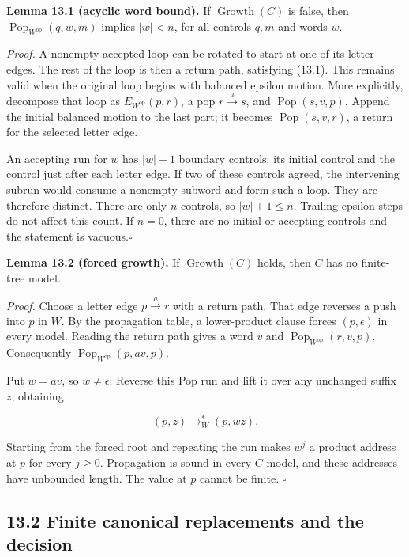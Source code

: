 \documentclass[
  11pt,
  a4paper,
]{article}
\newcounter{none} %
\begin{document}

\textbf{Lemma 13.1 (acyclic word bound).} If
\(\operatorname{Growth}(C)\) is false, then
\(\operatorname{Pop}_{W^{\mathrm{op}}}(q,w,m)\) implies \(|w|<n\), for
all controls \(q,m\) and words \(w\).

\emph{Proof.} A nonempty accepted loop can be rotated to start at one of
its letter edges. The rest of the loop is then a return path, satisfying
(13.1). This remains valid when the original loop begins with balanced
epsilon motion. More explicitly, decompose that loop as
\(E_{W^{\mathrm{op}}}(p,r)\), a pop \(r\xrightarrow{a}s\), and
\(\operatorname{Pop}(s,v,p)\). Append the initial balanced motion to the
last part; it becomes \(\operatorname{Pop}(s,v,r)\), a return for the
selected letter edge.

An accepting run for \(w\) has \(|w|+1\) boundary controls: its initial
control and the control just after each letter edge. If two of these
controls agreed, the intervening subrun would consume a nonempty subword
and form such a loop. They are therefore distinct. There are only \(n\)
controls, so \(|w|+1\le n\). Trailing epsilon steps do not affect this
count. If \(n=0\), there are no initial or accepting controls and the
statement is vacuous.\nobreak\hspace{.5em}\(\square\)


\textbf{Lemma 13.2 (forced growth).} If \(\operatorname{Growth}(C)\)
holds, then \(C\) has no finite-tree model.

\emph{Proof.} Choose a letter edge \(p\xrightarrow{a}r\) with a return
path. That edge reverses a push into \(p\) in \(W\). By the propagation
table, a lower-product clause forces \((p,\epsilon)\) in every model.
Reading the return path gives a word \(v\) and
\(\operatorname{Pop}_{W^{\mathrm{op}}}(r,v,p)\). Consequently
\(\operatorname{Pop}_{W^{\mathrm{op}}}(p,av,p)\).

Put \(w=av\), so \(w\ne\epsilon\). Reverse this Pop run and lift it over
any unchanged suffix \(z\), obtaining

\[(p,z)\longrightarrow_W^*(p,wz).\]

Starting from the forced root and repeating the run makes \(w^j\) a
product address at \(p\) for every \(j\ge0\). Propagation is sound in
every \(C\)-model, and these addresses have unbounded length. The value
at \(p\) cannot be finite. \(\square\)

\subsection{13.2 Finite canonical replacements and the
decision}\label{finite-canonical-replacements-and-the-decision}
\end{document}
